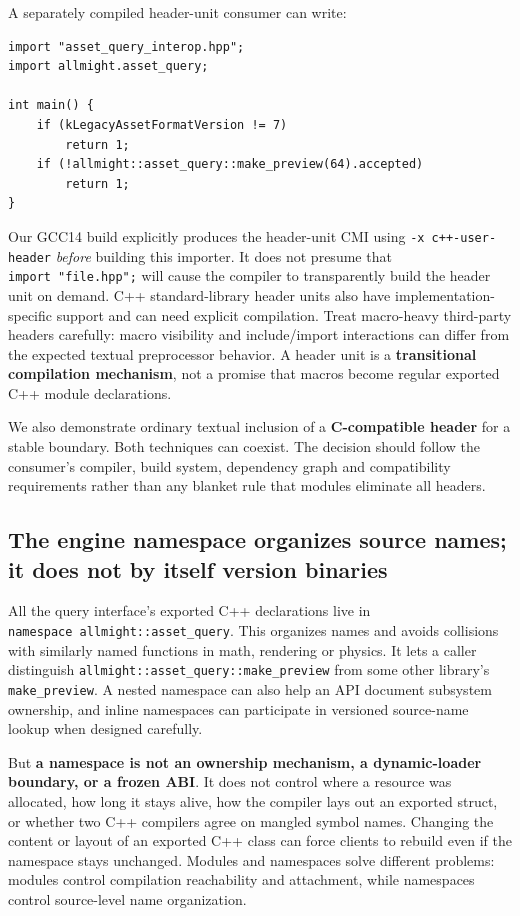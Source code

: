 A separately compiled header-unit consumer can write:

\begin{verbatim}
import "asset_query_interop.hpp";
import allmight.asset_query;

int main() {
    if (kLegacyAssetFormatVersion != 7)
        return 1;
    if (!allmight::asset_query::make_preview(64).accepted)
        return 1;
}
\end{verbatim}

Our GCC14 build explicitly produces the header-unit CMI using \texttt{-x\ c++-user-header} \emph{before} building this importer. It does not presume that \texttt{import\ "file.hpp";} will cause the compiler to transparently build the header unit on demand. C++ standard-library header units also have implementation-specific support and can need explicit compilation. Treat macro-heavy third-party headers carefully: macro visibility and include/import interactions can differ from the expected textual preprocessor behavior. A header unit is a \textbf{transitional compilation mechanism}, not a promise that macros become regular exported C++ module declarations.

We also demonstrate ordinary textual inclusion of a \textbf{C-compatible header} for a stable boundary. Both techniques can coexist. The decision should follow the consumer's compiler, build system, dependency graph and compatibility requirements rather than any blanket rule that modules eliminate all headers.

\subsection{The engine namespace organizes source names; it does not by itself version binaries}\label{05-engine-i-ch006-the-engine-namespace-organizes-source-names-it-does-not-by-itself-version-binaries}

All the query interface's exported C++ declarations live in \texttt{namespace\ allmight::asset\_query}. This organizes names and avoids collisions with similarly named functions in math, rendering or physics. It lets a caller distinguish \texttt{allmight::asset\_query::make\_preview} from some other library's \texttt{make\_preview}. A nested namespace can also help an API document subsystem ownership, and inline namespaces can participate in versioned source-name lookup when designed carefully.

But \textbf{a namespace is not an ownership mechanism, a dynamic-loader boundary, or a frozen ABI}. It does not control where a resource was allocated, how long it stays alive, how the compiler lays out an exported struct, or whether two C++ compilers agree on mangled symbol names. Changing the content or layout of an exported C++ class can force clients to rebuild even if the namespace stays unchanged. Modules and namespaces solve different problems: modules control compilation reachability and attachment, while namespaces control source-level name organization.

